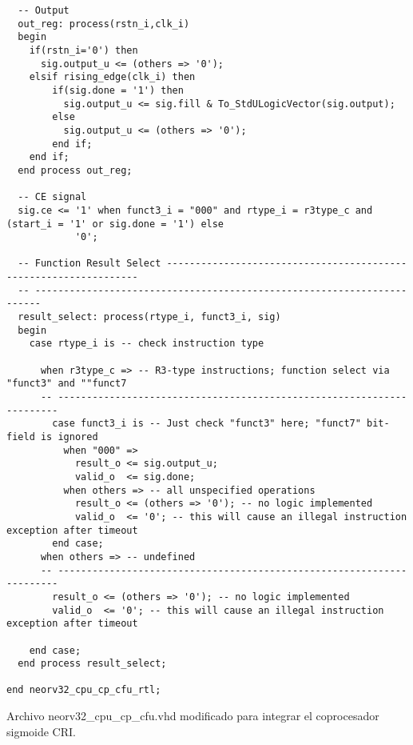\begin{code}
\begin{verbatim}
  -- Output
  out_reg: process(rstn_i,clk_i)
  begin
    if(rstn_i='0') then
      sig.output_u <= (others => '0');
    elsif rising_edge(clk_i) then
        if(sig.done = '1') then
          sig.output_u <= sig.fill & To_StdULogicVector(sig.output);     
        else
          sig.output_u <= (others => '0'); 
        end if;
    end if;
  end process out_reg;

  -- CE signal
  sig.ce <= '1' when funct3_i = "000" and rtype_i = r3type_c and (start_i = '1' or sig.done = '1') else
            '0';

  -- Function Result Select -----------------------------------------------------------------
  -- -----------------------------------------------------------------------
  result_select: process(rtype_i, funct3_i, sig)
  begin
    case rtype_i is -- check instruction type

      when r3type_c => -- R3-type instructions; function select via "funct3" and ""funct7
      -- ----------------------------------------------------------------------
        case funct3_i is -- Just check "funct3" here; "funct7" bit-field is ignored
          when "000" => 
            result_o <= sig.output_u; 
            valid_o  <= sig.done; 
          when others => -- all unspecified operations
            result_o <= (others => '0'); -- no logic implemented
            valid_o  <= '0'; -- this will cause an illegal instruction exception after timeout
        end case;
      when others => -- undefined
      -- ----------------------------------------------------------------------
        result_o <= (others => '0'); -- no logic implemented
        valid_o  <= '0'; -- this will cause an illegal instruction exception after timeout

    end case;
  end process result_select;

end neorv32_cpu_cp_cfu_rtl;
\end{verbatim}
\caption{Archivo neorv32\_cpu\_cp\_cfu.vhd modificado para integrar el coprocesador sigmoide CRI.}
\label{ap-cod:25}
\end{code}

